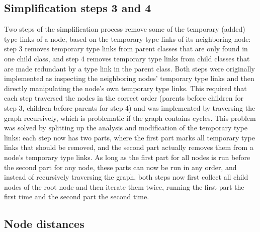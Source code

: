 \subsection{Simplification steps 3 and 4}
\label{subsec:RDF2Graph+Wikidata:cyclic-graphs:simplify-step-3+4}

Two steps of the simplification process
remove some of the temporary (added) type links of a node,
based on the temporary type links of its neighboring node:
step 3 removes temporary type links from parent classes that are only found in one child class,
and step 4 removes temporary type links from child classes that are made redundant by a type link in the parent class.
Both steps were originally implemented as inspecting the neighboring nodes’ temporary type links
and then directly manipulating the node’s own temporary type links.
This required that each step traversed the nodes in the correct order
(parents before children for step 3,
children before parents for step 4)
and was implemented by traversing the graph recursively,
which is problematic if the graph contains cycles.
This problem was solved by splitting up the analysis and modification of the temporary type links:
each step now has two parts,
where the first part marks all temporary type links that should be removed,
and the second part actually removes them from a node’s temporary type links.
As long as the first part for all nodes is run before the second part for any node,
these parts can now be run in any order,
and instead of recursively traversing the graph,
both steps now first collect all child nodes of the root node
and then iterate them twice,
running the first part the first time and the second part the second time.

\subsection{Node distances}
\label{subsec:RDF2Graph+Wikidata:cyclic-graph:distance}

